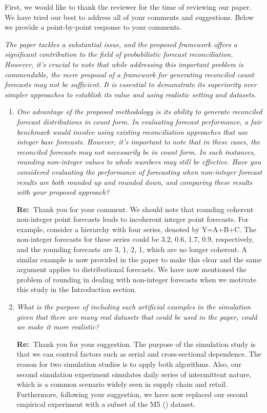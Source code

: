 \documentclass[11pt,a4paper]{article}
\newcommand{\RE}[2][Re:~]{{\color{blue}\textbf{#1}#2}}
\begin{document}
\RE[]{First, we would like to thank the reviewer for the time of reviewing our paper. We have tried our best to address all of your comments and suggestions. Below we provide a point-by-point response to your comments.}


\textit{The paper tackles a substantial issue, and the proposed framework offers a significant contribution to the field of probabilistic forecast reconciliation. However, it's crucial to note that while addressing this important problem is commendable, the mere proposal of a framework for generating reconciled count forecasts may not be sufficient. It is essential to demonstrate its superiority over simpler approaches to establish its value and using realistic setting and datasets.}

\begin{enumerate}
  \item \textit{One advantage of the proposed methodology is its ability to generate reconciled forecast distributions in count form. In evaluating forecast performance, a fair benchmark would involve using existing reconciliation approaches that use integer base forecasts. However, it's important to note that in these cases, the reconciled forecasts may not necessarily be in count form. In such instances, rounding non-integer values to whole numbers may still be effective. Have you considered evaluating the performance of forecasting when non-integer forecast results are both rounded up and rounded down, and comparing these results with your proposed approach?}

  \RE{Thank you for your comment. We should note that rounding coherent non-integer point forecasts leads to incoherent integer point forecasts. For example, consider a hierarchy with four series, denoted by Y=A+B+C. The non-integer forecasts for these series could be 3.2, 0.6, 1.7, 0.9, respectively, and the rounding forecasts are 3, 1, 2, 1, which are no longer coherent. A similar example is now provided in the paper to make this clear and the same argument applies to distributional forecasts. We have now mentioned the problem of rounding in dealing with non-integer forecasts when we motivate this study in the Introduction section.}


  \item \textit{What is the purpose of including such artificial examples in the simulation given that there are many real datasets that could be used in the paper, could we make it more realistic?}

  \RE{Thank you for your suggestion. The purpose of the simulation study is that we can control factors such as serial and cross-sectional dependence. The reason for two simulation studies is to apply both algorithms. Also, our second simulation experiment simulates daily series of intermittent nature, which is a common scenario widely seen in supply chain and retail. Furthermore, following your suggestion, we have now replaced our second empirical experiment with a subset of the M5 (\citealp{makridakisM5AccuracyCompetition2022}) dataset.}


\end{enumerate}
\end{document}
